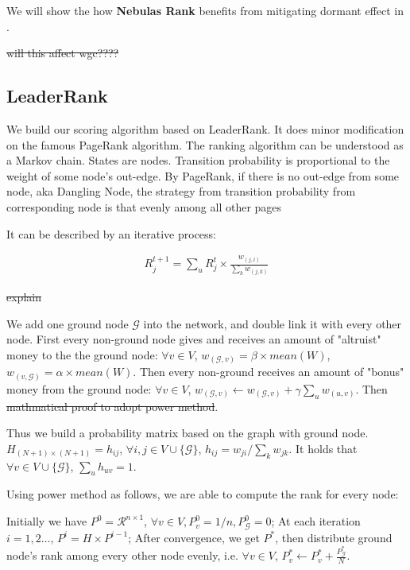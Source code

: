 We will show the how \textbf{Nebulas Rank} benefits from mitigating dormant effect in .

\st{will this affect wgc????}

\subsection{LeaderRank} \label{sec:leaderrank}
We build our scoring algorithm based on LeaderRank\cite{Li2014}\cite{Chen2013}. It does minor modification on the famous PageRank algorithm\cite{Brin2010}\cite{page1999pagerank}. The ranking algorithm can be understood as a Markov chain. States are nodes. Transition probability is proportional to the weight of some node's out-edge. By PageRank, if there is no out-edge from some node, aka Dangling Node\cite{Kim2002}, the strategy from transition probability from corresponding node is that evenly among all other pages


 It can be described  by an iterative process:

\begin{align}
	R_j^{t+1} = \sum_u R_j^t \times \frac{ w_{(j,i)} }{ \sum_k w_{(j,k)} }
\end{align}


\st{explain}

We add one ground node $\mathcal{G}$ into the network, and double link it with every other node. First every non-ground node gives and receives an amount of "altruist" money to the the ground node: $\forall v \in V$, $w_{(\mathcal{G}, v)} = \beta \times mean(W)$, $w_{(v,\mathcal{G})} = \alpha \times mean(W)  $. Then every non-ground receives an amount of "bonus" money from the ground node:  $\forall v \in V$, $w_{(\mathcal{G}, v)} \leftarrow w_{(\mathcal{G}, v)} + \gamma \sum_u w_{(u,v)}$. Then \st{mathmatical proof to adopt power method}.

Thus we build a probability matrix based on the graph with ground node. $H_{(N+1) \times (N+1)} = h_{ij}$, $\forall i,j \in V \cup \{\mathcal{G}\}$, $h_{ij} = w_{ji} / \sum_k{w_{jk}}$. It holds that $\forall v \in V \cup \{\mathcal{G}\}$, $\sum_u{h_{uv}} = 1$.

Using power method as follows, we are able to compute the rank for every node: 

Initially we have $P^0 = \mathcal{R}^{n \times 1} $, $\forall v \in V, P_v^0 = 1/n, P_{\mathcal{G}}^0 = 0$;
At each iteration $i=1,2 \dots $, $P^i = H \times P^{i-1}$;
After convergence, we get $P^*$, then distribute ground node's rank among every other node evenly, i.e. $\forall v \in V$, $P^*_v \leftarrow P^*_v + \frac{P^*_{\mathcal{G}}}{N}$.



